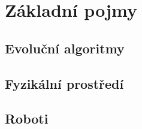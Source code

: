 
\chapter{Základní pojmy}

\section{Evoluční algoritmy}

\section{Fyzikální prostředí}

\section{Roboti}

